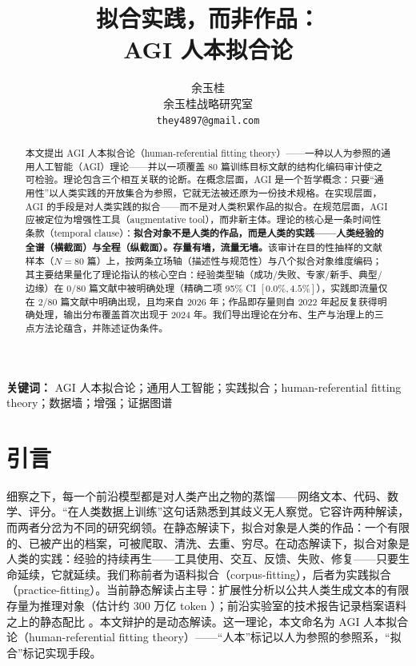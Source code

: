 \documentclass[10pt,fontset=fandol]{ctexart}
\title{\textbf{拟合实践，而非作品：\\AGI 人本拟合论}}
\author{余玉桂\\
余玉桂战略研究室\\
\texttt{they4897@gmail.com}
}
\date{}
\begin{document}
\maketitle

\begin{abstract}
\noindent 本文提出 AGI 人本拟合论（human-referential fitting theory）——一种以人为参照的通用人工智能（AGI）理论——并以一项覆盖 80 篇训练目标文献的结构化编码审计使之可检验。理论包含三个相互关联的论断。在概念层面，AGI 是一个哲学概念：只要“通用性”以人类实践的开放集合为参照，它就无法被还原为一份技术规格。在实现层面，AGI 的手段是对人类实践的拟合——而不是对人类积累作品的拟合。在规范层面，AGI 应被定位为增强性工具（augmentative tool），而非新主体。理论的核心是一条时间性条款（temporal clause）：\textbf{拟合对象不是人类的作品，而是人类的实践——人类经验的全谱（横截面）与全程（纵截面）。存量有墙，流量无墙。}该审计在目的性抽样的文献样本（$N = 80$ 篇）上，按两条立场轴（描述性与规范性）与八个拟合对象维度编码；其主要结果量化了理论指认的核心空白：经验类型轴（成功/失败、专家/新手、典型/边缘）在 0/80 篇文献中被明确处理（精确二项 95\% CI $[0.0\%, 4.5\%]$），实践即流量仅在 2/80 篇文献中明确出现，且均来自 2026 年；作品即存量则自 2022 年起反复获得明确处理，输出分布覆盖首次出现于 2024 年。我们导出理论在分布、生产与治理上的三点方法论蕴含，并陈述证伪条件。
\end{abstract}

\medskip
\noindent\textbf{关键词：} AGI 人本拟合论；通用人工智能；实践拟合；human-referential fitting theory；数据墙；增强；证据图谱

\section{引言}\label{sec:intro}

细察之下，每一个前沿模型都是对人类产出之物的蒸馏——网络文本、代码、数学、评分。“在人类数据上训练”这句话熟悉到其歧义无人察觉。它容许两种解读，而两者分岔为不同的研究纲领。在静态解读下，拟合对象是人类的作品：一个有限的、已被产出的档案，可被爬取、清洗、去重、穷尽。在动态解读下，拟合对象是人类的实践：经验的持续再生——工具使用、交互、反馈、失败、修复——只要生命延续，它就延续。我们称前者为语料拟合（corpus-fitting），后者为实践拟合（practice-fitting）。当前静态解读占主导：扩展性分析以公共人类生成文本的有限存量为推理对象（估计约 300 万亿 token \cite{villalobos2022data}）；前沿实验室的技术报告记录档案语料之上的静态配比 \cite{grattafiori2024llama3}。本文辩护的是动态解读。这一理论，本文命名为 AGI 人本拟合论（human-referential fitting theory）——“人本”标记以人为参照的参照系，“拟合”标记实现手段。
\end{document}
